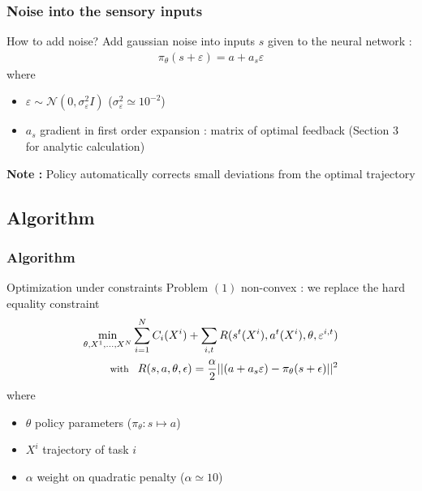 \documentclass[mathserif]{beamer}
\begin{document}
\begin{frame}
  \frametitle{{Noise into the sensory inputs}}
   \begin{block}{How to add noise?}
  Add gaussian noise into inputs $s$ given to the neural network : 
  \begin{align*}
  \pi_{\theta}(s + \varepsilon) = a + a_{s}\varepsilon 
  \end{align*}
  where 
  \begin{itemize}
  \item $\varepsilon \sim \mathcal{N}(0,\sigma_{\varepsilon}^{2}I)$ \hspace{5mm} ($\sigma_{\varepsilon}^{2} \simeq 10^{-2}$)
  \item $a_s$ gradient in first order expansion : matrix of optimal feedback (Section 3 for analytic calculation)
  \end{itemize}
  \end{block}
  
  \vspace{20pt}

\textbf{Note :} Policy automatically corrects small deviations from the optimal trajectory
\end{frame}


\subsection{Algorithm}

\begin{frame}
  \frametitle{{Algorithm}}
  \begin{block}{Optimization under constraints}
  Problem $(1)$ non-convex : we replace the hard equality constraint
  \begin{align*}
  \min_{\theta,X^1,...,X^N} \sum\limits_{i=1}^{N} C_{i}(X^{i}) + \sum\limits_{i,t} R(s^{t}(X^{i}),a^{t}(X^{i}),\theta,\varepsilon^{i,t})\\ \text{\footnotesize with } \hspace{5pt}
  R(s,a,\theta,\epsilon) = \frac{\alpha}{2}||(a+a_s\varepsilon) - \pi_{\theta}(s+\epsilon)||^2
  \end{align*}
  where 
  \begin{itemize}
  \item $\theta$ policy parameters ($\pi_{\theta} : s \mapsto a$) 
  \item $X^{i}$ trajectory of task $i$
  \item $\alpha$ weight on quadratic penalty ($\alpha \simeq 10$)
  \end{itemize}
  \end{block}

\end{frame}
\end{document}
